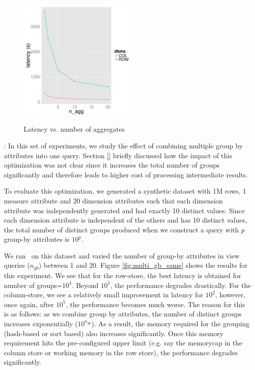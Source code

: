 \begin{figure}[h]
\centering
{\includegraphics[width=6cm] {Images/multi_agg.pdf}}
\caption{Latency vs. number of aggregates}
\label{fig:multi_agg}
\end{figure} 

: In this set of experiments, we
study the effect of combining multiple group by attributes into one query.
Section \ref{} briefly discussed how the impact of this optimization was not
clear since it increases the total number of groups significantly and therefore
leads to higher cost of processing intermediate results.

To evaluate this optimization, we generated a synthetic dataset with 1M rows, 1
measure attribute and 20 dimension attributes such that each dimension attribute
was independently generated and had exactly 10 distinct values.
Since each dimension attribute is independent of the others and has 10 distinct
values, the total number of distinct groups produced when we construct a query
with $p$ group-by attributes is $10^p$.

We ran \VizRecDB\ on this dataset and varied the number of group-by
attributes in view queries ($n_{gb}$) between 1 and 20.
Figure \ref{fig:multi_gb_same} shows the results for this experiment.
We see that for the row-store, the best latency is obtained for number of
groups=$10^4$.
Beyond $10^5$, the performance degrades drastically. 
For the column-store, we see a relatively small improvement in latency
for $10^2$, however, once again, after $10^5$, the performance becomes
much worse.
The reason for this is as follows: as we combine group by attributes, the number
of distinct groups increases exponentially ($10^{n_{gb}}$). 
As a result, the memory required for the grouping (hash-based or sort based)
also increases significantly.
Once this memory requirement hits the pre-configured upper limit (e.g. say the
memorycap in the column store or working memory in the row store), the
performance degrades significantly.

